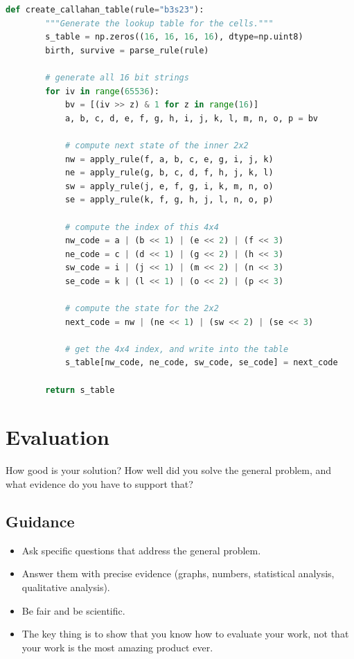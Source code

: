 \documentclass{l4proj}
\begin{document}
\begin{lstlisting}[language=python]
    def create_callahan_table(rule="b3s23"):
        """Generate the lookup table for the cells."""        
        s_table = np.zeros((16, 16, 16, 16), dtype=np.uint8)
        birth, survive = parse_rule(rule)

        # generate all 16 bit strings
        for iv in range(65536):
            bv = [(iv >> z) & 1 for z in range(16)]
            a, b, c, d, e, f, g, h, i, j, k, l, m, n, o, p = bv

            # compute next state of the inner 2x2
            nw = apply_rule(f, a, b, c, e, g, i, j, k)
            ne = apply_rule(g, b, c, d, f, h, j, k, l)
            sw = apply_rule(j, e, f, g, i, k, m, n, o)
            se = apply_rule(k, f, g, h, j, l, n, o, p)

            # compute the index of this 4x4
            nw_code = a | (b << 1) | (e << 2) | (f << 3)
            ne_code = c | (d << 1) | (g << 2) | (h << 3)
            sw_code = i | (j << 1) | (m << 2) | (n << 3)
            se_code = k | (l << 1) | (o << 2) | (p << 3)

            # compute the state for the 2x2
            next_code = nw | (ne << 1) | (sw << 2) | (se << 3)

            # get the 4x4 index, and write into the table
            s_table[nw_code, ne_code, sw_code, se_code] = next_code

        return s_table

\end{lstlisting}







\chapter{Evaluation} 
How good is your solution? How well did you solve the general problem, and what evidence do you have to support that?

\section{Guidance}
\begin{itemize}
    \item
        Ask specific questions that address the general problem.
    \item
        Answer them with precise evidence (graphs, numbers, statistical
        analysis, qualitative analysis).
    \item
        Be fair and be scientific.
    \item
        The key thing is to show that you know how to evaluate your work, not
        that your work is the most amazing product ever.
\end{itemize}
\end{document}
